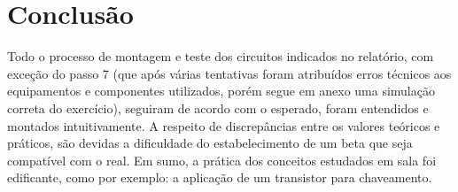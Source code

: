 \chapter{Conclus\~{a}o}
Todo o processo de montagem e teste dos circuitos indicados no relatório, com exceção do passo 7 (que após várias tentativas foram atribuídos erros técnicos aos equipamentos e componentes utilizados, porém segue em anexo uma simulação correta do exercício), seguiram de acordo com o esperado, foram entendidos e montados intuitivamente.
A respeito de discrepâncias entre os valores teóricos e práticos, são devidas a dificuldade do estabelecimento de um beta que seja compatível com o real.
Em sumo, a prática dos conceitos estudados em sala foi edificante, como por exemplo: a aplicação de um transistor para chaveamento.